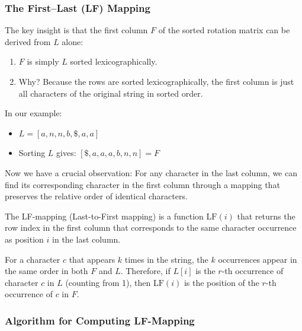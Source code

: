 \subsubsection{The First–Last (LF) Mapping}

The key insight is that the first column \(F\) of the sorted rotation matrix can be derived from \(L\) alone:

\begin{enumerate}
    \item \(F\) is simply \(L\) sorted lexicographically.
    \item Why? Because the rows are sorted lexicographically, the first column is just all characters of the original string in sorted order.
\end{enumerate}

In our example:
\begin{itemize}
    \item \(L = [a, n, n, b, \$, a, a]\)
    \item Sorting \(L\) gives: \([\$, a, a, a, b, n, n] = F\)
\end{itemize}

Now we have a crucial observation: For any character in the last column, we can find its corresponding character in the first column through a mapping that preserves the relative order of identical characters.

\begin{definitionbox}[LF-Mapping]
The LF-mapping (Last-to-First mapping) is a function \(\text{LF}(i)\) that returns the row index in the first column that corresponds to the same character occurrence as position \(i\) in the last column.

For a character \(c\) that appears \(k\) times in the string, the \(k\) occurrences appear in the same order in both \(F\) and \(L\). Therefore, if \(L[i]\) is the \(r\)-th occurrence of character \(c\) in \(L\) (counting from 1), then \(\text{LF}(i)\) is the position of the \(r\)-th occurrence of \(c\) in \(F\).
\end{definitionbox}

\subsubsection{Algorithm for Computing LF-Mapping}

